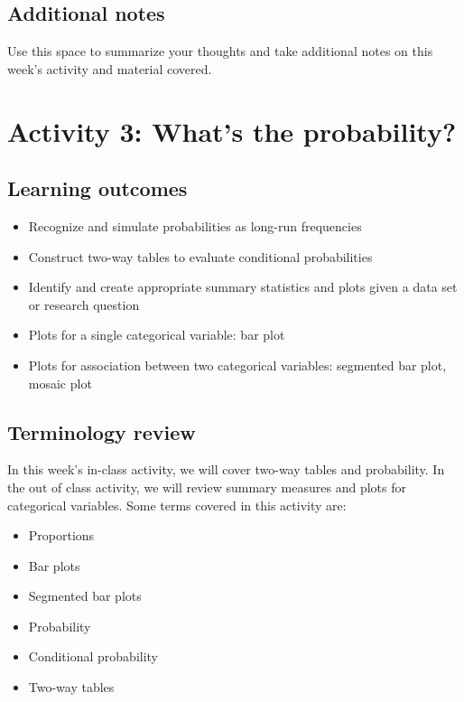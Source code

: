 \documentclass[
]{report}
\begin{document}
\newpage

\hypertarget{additional-notes}{%
\section{Additional notes}\label{additional-notes}}

Use this space to summarize your thoughts and take additional notes on this week's activity and material covered.

\hypertarget{activity-3-whats-the-probability}{%
\chapter{Activity 3: What's the probability?}\label{activity-3-whats-the-probability}}

\hypertarget{learning-outcomes}{%
\section{Learning outcomes}\label{learning-outcomes}}

\begin{itemize}
\item
  Recognize and simulate probabilities as long-run frequencies
\item
  Construct two-way tables to evaluate conditional probabilities
\item
  Identify and create appropriate summary statistics and plots
  given a data set or research question
\item
  Plots for a single categorical variable: bar plot
\item
  Plots for association between two categorical variables:
  segmented bar plot, mosaic plot
\end{itemize}

\hypertarget{terminology-review}{%
\section{Terminology review}\label{terminology-review}}

In this week's in-class activity, we will cover two-way tables and probability. In the out of class activity, we will review summary measures and plots for categorical variables. Some terms covered in this activity are:

\begin{itemize}
\item
  Proportions
\item
  Bar plots
\item
  Segmented bar plots
\item
  Probability
\item
  Conditional probability
\item
  Two-way tables
\end{itemize}
\end{document}
